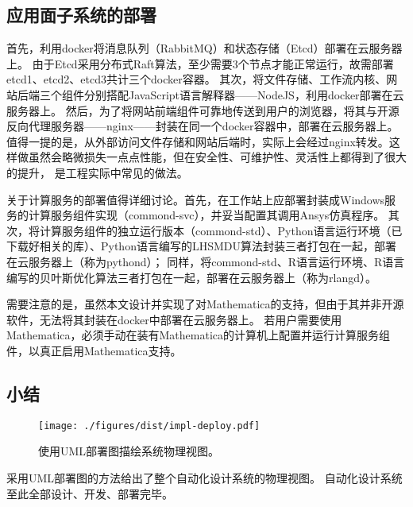 \documentclass[index]{subfiles}
\begin{document}
\subsection{应用面子系统的部署}
首先，利用docker将消息队列（RabbitMQ）和状态存储（Etcd）部署在云服务器上。
由于Etcd采用分布式Raft算法，至少需要3个节点才能正常运行，故需部署etcd1、etcd2、etcd3共计三个docker容器。
其次，将文件存储、工作流内核、网站后端三个组件分别搭配JavaScript语言解释器——NodeJS，利用docker部署在云服务器上。
然后，为了将网站前端组件可靠地传送到用户的浏览器，将其与开源反向代理服务器——nginx——封装在同一个docker容器中，部署在云服务器上。
值得一提的是，从外部访问文件存储和网站后端时，实际上会经过nginx转发。这样做虽然会略微损失一点点性能，但在安全性、可维护性、灵活性上都得到了很大的提升，
是工程实际中常见的做法。

关于计算服务的部署值得详细讨论。首先，在工作站上应部署封装成Windows服务的计算服务组件实现（commond-svc），并妥当配置其调用Ansys仿真程序。
其次，将计算服务组件的独立运行版本（commond-std）、Python语言运行环境（已下载好相关的库）、Python语言编写的LHSMDU算法封装三者打包在一起，部署在云服务器上（称为pythond）；
同样，将commond-std、R语言运行环境、R语言编写的贝叶斯优化算法三者打包在一起，部署在云服务器上（称为rlangd）。

需要注意的是，虽然本文设计并实现了对Mathematica的支持，但由于其并非开源软件，无法将其封装在docker中部署在云服务器上。
若用户需要使用Mathematica，必须手动在装有Mathematica的计算机上配置并运行计算服务组件，以真正启用Mathematica支持。

\subsection{小结}
\begin{figure}[h]
  \centering
  \texttt{[image: ./figures/dist/impl-deploy.pdf]}
  \caption[系统物理视图]{使用UML部署图描绘系统物理视图。\label{fig:impl-deploy}}
\end{figure}
采用UML部署图的方法给出了整个自动化设计系统的物理视图。
自动化设计系统至此全部设计、开发、部署完毕。
\end{document}
